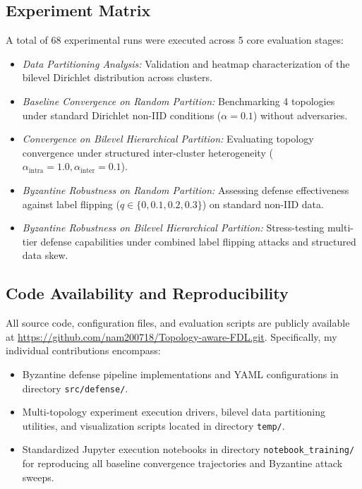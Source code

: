 \documentclass[11pt, a4paper]{article}
\begin{document}
\subsection{Experiment Matrix}
A total of 68 experimental runs were executed across 5 core evaluation stages:
\begin{itemize}
    \item \textit{Data Partitioning Analysis:} Validation and heatmap characterization of the bilevel Dirichlet distribution across clusters.
    \item \textit{Baseline Convergence on Random Partition:} Benchmarking 4 topologies under standard Dirichlet non-IID conditions ($\alpha=0.1$) without adversaries.
    \item \textit{Convergence on Bilevel Hierarchical Partition:} Evaluating topology convergence under structured inter-cluster heterogeneity ($\alpha_{\text{intra}}=1.0, \alpha_{\text{inter}}=0.1$).
    \item \textit{Byzantine Robustness on Random Partition:} Assessing defense effectiveness against label flipping ($q \in \{0, 0.1, 0.2, 0.3\}$) on standard non-IID data.
    \item \textit{Byzantine Robustness on Bilevel Hierarchical Partition:} Stress-testing multi-tier defense capabilities under combined label flipping attacks and structured data skew.
\end{itemize}

\subsection{Code Availability and Reproducibility}
All source code, configuration files, and evaluation scripts are publicly available at \url{https://github.com/nam200718/Topology-aware-FDL.git}. Specifically, my individual contributions encompass:
\begin{itemize}
    \item Byzantine defense pipeline implementations and YAML configurations in directory \texttt{src/defense/}.
    \item Multi-topology experiment execution drivers, bilevel data partitioning utilities, and visualization scripts located in directory \texttt{temp/}.
    \item Standardized Jupyter execution notebooks in directory \texttt{notebook\_training/} for reproducing all baseline convergence trajectories and Byzantine attack sweeps.
\end{itemize}
\end{document}
